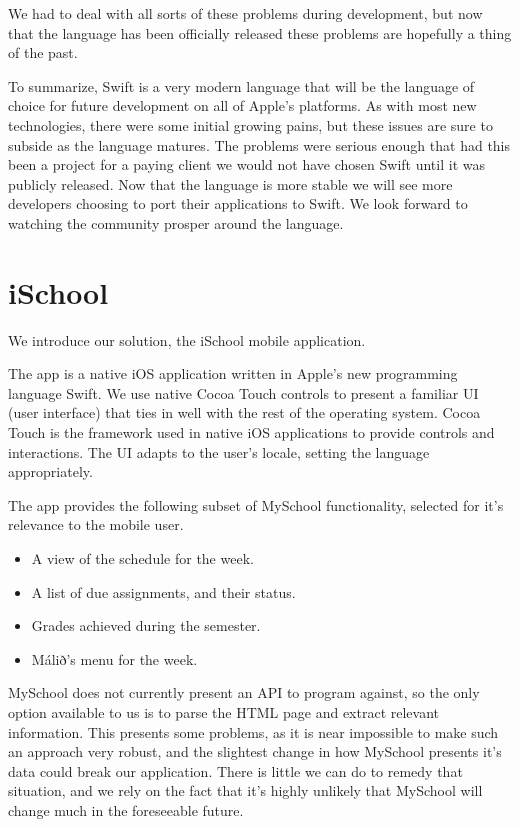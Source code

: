 \documentclass[pdftex, DIV=calc, paper=a4, fontsize=11pt]{scrartcl}	 %
\begin{document}
We had to deal with all sorts of these problems during development, but now that the language has 
been officially released these problems are hopefully a thing of the past.

To summarize, Swift is a very modern language that will be the language of choice for future 
development on all of Apple's platforms. As with most new technologies, there were some initial
growing pains, but these issues are sure to subside as the language matures. The problems were 
serious enough that had this been a project for a paying client we would not have chosen Swift
until it was publicly released. Now that the language is more stable we will see more
developers choosing to port their applications to Swift. 
We look forward to watching the community prosper around the language.


\section{iSchool}
\label{sec:ischool}

We introduce our solution, the iSchool mobile application.

The app is a native iOS application written in Apple's new programming language Swift.
We use native Cocoa Touch controls to present a familiar UI (user interface) that ties in well with
the rest of the operating system. Cocoa Touch is the framework used in native
iOS applications to provide controls and interactions.
The UI adapts to the user's locale, setting the language appropriately.

The app provides the following subset of MySchool functionality, selected for it's relevance to
the mobile user.

\begin{itemize}
    \item A view of the schedule for the week.
    \item A list of due assignments, and their status.
    \item Grades achieved during the semester.
    \item Málið's menu for the week.
\end{itemize}


MySchool does not currently present an API to program against, so the only option available to us
is to parse the HTML page and extract relevant information. This presents some problems, as it is
near impossible to make such an approach very robust, and the slightest change in how MySchool presents
it's data could break our application. There is little we can do to remedy that situation, and we
rely on the fact that it's highly unlikely that MySchool will change much in the foreseeable future.
\end{document}
